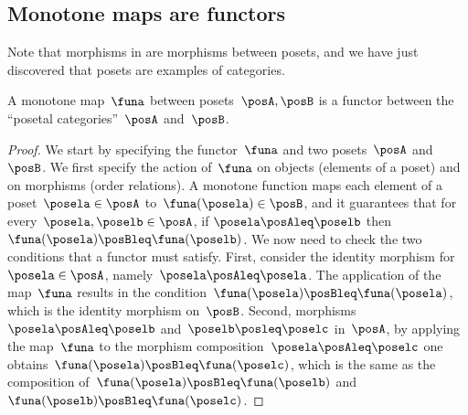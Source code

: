 \subsection{Monotone maps are functors}
Note that morphisms in \Pos are morphisms between posets, and we have just discovered that posets are examples of categories.
\begin{lemma}
  \label{lem:posetfunctor}
  A monotone map~$\funa$ between posets~$\posA,\posB$ is a functor between the ``posetal categories''~$\posA$ and~$\posB$.  
\end{lemma}
\begin{proof}
  We start by specifying the functor~$\funa$ and two posets~$\posA$ and~$\posB$. We first specify the action of~$\funa$ on objects (elements of a poset) and on morphisms (order relations). A monotone function maps each element of a poset~$\posela\in \posA$ to~$\funa(\posela) \in \posB$, and it guarantees that for every~$\posela,\poselb\in \posA$, if $\posela\posAleq \poselb$ then~$\funa(\posela)\posBleq \funa(\poselb)$. We now need to check the two conditions that a functor must satisfy. First, consider the identity morphism for~$\posela\in \posA$, namely~$\posela \posAleq \posela$. The application of the map~$\funa$ results in the condition~$\funa(\posela)\posBleq \funa(\posela)$, which is the identity morphism on~$\posB$. Second, morphisms~$\posela\posAleq \poselb$ and~$\poselb\posleq \poselc$ in~$\posA$, by applying the map~$\funa$ to the morphism composition~$\posela\posAleq \poselc$ one obtains~$\funa(\posela)\posBleq \funa(\poselc)$, which is the same as the composition of~$\funa(\posela)\posBleq \funa(\poselb)$ and~$\funa(\poselb)\posBleq \funa(\poselc)$.
\end{proof}

\devel{} %
